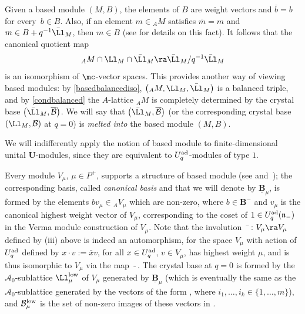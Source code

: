 Given a based module $(M,B)$, the elements of $B$ are weight vectors and $\overline{b}=b$ for every~${b\in B}$. Also, if an element $m\in {}_A M$ satisfies $\overline{m}=m$ and $m\in B + q^{-1}\bar{\Ll}_M$, then $m\in B$ (see \cite[Section~27.1.5]{Lusztig} for details on this fact). It follows that the canonical quotient map
\begin{equation}\label{basedbalancediso} {}_A M \cap \Ll_M \cap \bar{\Ll}_M \ra \bar{\Ll}_M/q^{-1}\bar{\Ll}_M
\end{equation}
is an isomorphism of $\mc$-vector spaces. This provides another way of viewing based modules: by \eqref{basedbalancediso}, $\big({}_A M, \Ll_M,\bar{\Ll}_M\big)$ is a balanced triple, and by \eqref{condbalanced} the $A$-lattice ${}_A M$ is completely determined by the crystal base $\big(\bar{\Ll}_M,\overline{\mathcal{B}}\big)$. We will say that $\big(\bar{\Ll}_M,\overline{\mathcal{B}}\big)$ (or the corresponding crystal base $(\Ll_M,\mathcal{B})$ at $q=0$) is {\it melted into} the based module $(M,B)$.

We will indifferently apply the notion of based module to finite-dimensional unital $\dot{\mathbf{U}}$-modules, since they are equivalent to $U_q^{\rm ad}$-modules of type $1$.


Every module $V_\mu$, $\mu\in P^+$, supports a structure of based module (see \cite[Section~14.4.10]{Lusztig} and~\cite{Kashiwara1}); the corresponding basis, called {\it canonical basis} and that we will denote by $\underline{\mathbf{B}}_{\mu}$, is formed by the elements $bv_{\mu}\in {}_AV_\mu$ which are non-zero, where $b\in \mathbf{B}^-$ and $v_{\mu}$ is the canonical highest weight vector of $V_{\mu}$, corresponding to the coset of $1\in U_q^{\rm ad}(\mathfrak{n}_-)$ in the Verma module construction of $V_{\mu}$. Note that the involution $\ \bar{}\ \colon V_{\mu}\ra V_{\mu}$ defined by (iii) above is indeed an automorphism, for the space $V_\mu$ with action of $U_q^{\rm ad}$ defined by $x\cdot v := \bar{x}v$, for all $x\in U_q^{\rm ad}$, $v\in V_\mu$, has highest weight $\mu$, and is thus isomorphic to $V_\mu$ via the map $\ \bar{}\ $. The crystal base  at $q=0$ is formed by the $\mathcal{A}_0$-sublattice $\Ll_\mu^{\rm low}$ of $V_{\mu}$ generated by $\underline{\mathbf{B}}_{\mu}$ (which is eventually the same as the $\mathcal{A}_0$-sublattice generated by the vectors of the form , where $i_1,\dots ,i_k \in \{1,\dots,m\}$), and $\mathcal{B}_\mu^{\rm low}$ is the set of non-zero images of these vectors in .

